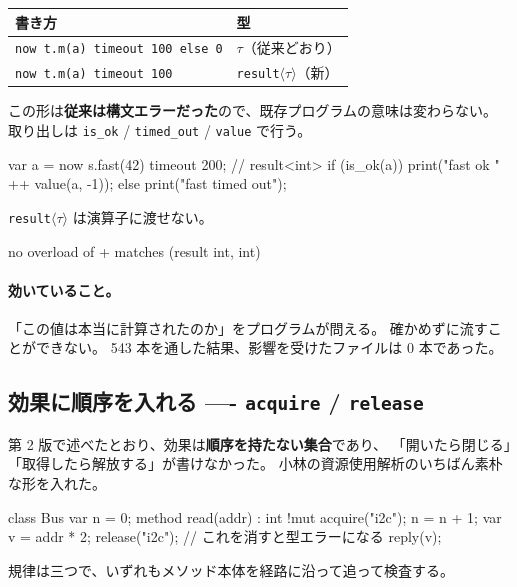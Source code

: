 \documentclass[11pt,a4paper]{ltjsarticle}
\theoremstyle{definition}
\theoremstyle{remark}
\begin{document}
\begin{center}
\begin{tabular}{ll}
\toprule
書き方 & 型 \\
\midrule
\texttt{now t.m(a) timeout 100 else 0} & $\tau$（従来どおり） \\
\texttt{now t.m(a) timeout 100}        & \texttt{result}$\langle\tau\rangle$（新） \\
\bottomrule
\end{tabular}
\end{center}

この形は\textbf{従来は構文エラーだった}ので、既存プログラムの意味は変わらない。
取り出しは \texttt{is\_ok} / \texttt{timed\_out} / \texttt{value} で行う。

\begin{aipl}
var a = now s.fast(42) timeout 200;      // result<int>
if (is_ok(a)) { print("fast ok " ++ value(a, -1)); }
else          { print("fast timed out"); }
\end{aipl}

\texttt{result}$\langle\tau\rangle$ は演算子に渡せない。

\begin{term}
 no overload of + matches (result int, int)
\end{term}

\paragraph{効いていること。}
「この値は本当に計算されたのか」をプログラムが問える。
確かめずに流すことができない。
543 本を通した結果、影響を受けたファイルは 0 本であった。

\subsection{効果に順序を入れる ---- \texttt{acquire} / \texttt{release}}
\label{sec:res}

第 2 版で述べたとおり、効果は\textbf{順序を持たない集合}であり、
「開いたら閉じる」「取得したら解放する」が書けなかった。
小林の資源使用解析のいちばん素朴な形を入れた。

\begin{aipl}
class Bus {
  var n = 0;
  method read(addr) : int !{mut} {
    acquire("i2c");
    n = n + 1;
    var v = addr * 2;
    release("i2c");           // これを消すと型エラーになる
    reply(v);
  }
}
\end{aipl}

規律は三つで、いずれもメソッド本体を経路に沿って追って検査する。
\end{document}
